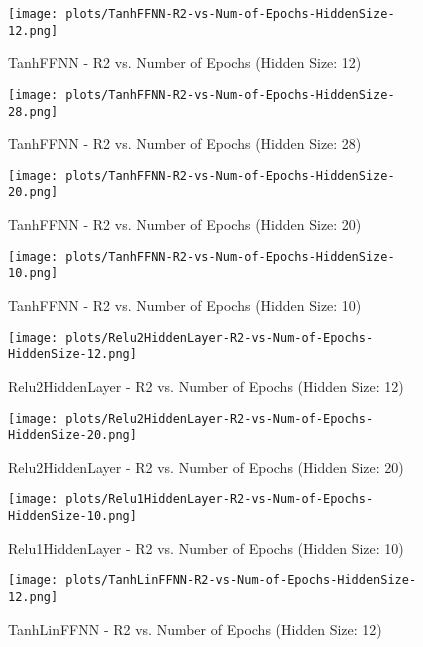 \begin{figure}[H]
    \centering
    \texttt{[image: plots/TanhFFNN-R2-vs-Num-of-Epochs-HiddenSize-12.png]}
    \caption{TanhFFNN - R2 vs. Number of Epochs (Hidden Size: 12)}
\end{figure}

\begin{figure}[H]
    \centering
    \texttt{[image: plots/TanhFFNN-R2-vs-Num-of-Epochs-HiddenSize-28.png]}
    \caption{TanhFFNN - R2 vs. Number of Epochs (Hidden Size: 28)}
\end{figure}

\begin{figure}[H]
    \centering
    \texttt{[image: plots/TanhFFNN-R2-vs-Num-of-Epochs-HiddenSize-20.png]}
    \caption{TanhFFNN - R2 vs. Number of Epochs (Hidden Size: 20)}
\end{figure}

\begin{figure}[H]
    \centering
    \texttt{[image: plots/TanhFFNN-R2-vs-Num-of-Epochs-HiddenSize-10.png]}
    \caption{TanhFFNN - R2 vs. Number of Epochs (Hidden Size: 10)}
\end{figure}

\begin{figure}[H]
    \centering
    \texttt{[image: plots/Relu2HiddenLayer-R2-vs-Num-of-Epochs-HiddenSize-12.png]}
    \caption{Relu2HiddenLayer - R2 vs. Number of Epochs (Hidden Size: 12)}
\end{figure}

\begin{figure}[H]
    \centering
    \texttt{[image: plots/Relu2HiddenLayer-R2-vs-Num-of-Epochs-HiddenSize-20.png]}
    \caption{Relu2HiddenLayer - R2 vs. Number of Epochs (Hidden Size: 20)}
\end{figure}

\begin{figure}[H]
    \centering
    \texttt{[image: plots/Relu1HiddenLayer-R2-vs-Num-of-Epochs-HiddenSize-10.png]}
    \caption{Relu1HiddenLayer - R2 vs. Number of Epochs (Hidden Size: 10)}
\end{figure}

\begin{figure}[H]
    \centering
    \texttt{[image: plots/TanhLinFFNN-R2-vs-Num-of-Epochs-HiddenSize-12.png]}
    \caption{TanhLinFFNN - R2 vs. Number of Epochs (Hidden Size: 12)}
\end{figure}

